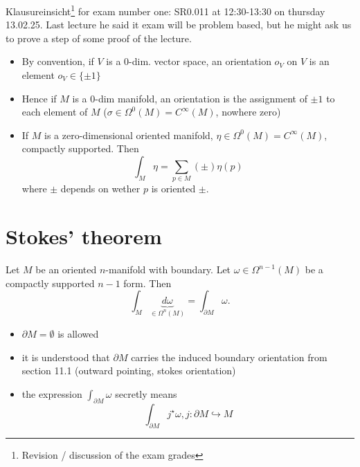
Klausureinsicht\footnote{Revision / discussion of the exam grades} for exam number one: SR0.011 at 12:30-13:30 on thursday 13.02.25.
Last lecture he said it exam will be problem based, but he might ask us to prove a step of some proof of the lecture.

\begin{remark}
    \begin{itemize}
        \item By convention, if \(V\) is a 0-dim. vector space, an orientation \(o_V\) on \(V\) is an element \(o_V\in \{\pm 1\}\)
        \item Hence if \(M\) is a 0-dim manifold, an orientation is the assignment of \(\pm 1\) to each element of \(M\) (\(\sigma\in \Omega^0(M)=C^\infty(M)\), nowhere zero)
        \item If \(M\) is a zero-dimensional oriented manifold, \(\eta\in \Omega^0(M)=C^\infty(M)\), compactly supported. Then \[\int_M \eta=\sum_{p\in M}(\pm)\eta(p)\] where \(\pm\) depends on wether \(p\) is oriented \(\pm\).  
    \end{itemize}
\end{remark}

\section{Stokes' theorem}

\begin{theorem}\label{thm:11.9}
    Let \(M\) be an oriented \(n\)-manifold with boundary. Let 
    \(\omega\in \Omega^{n-1}(M)\) be a compactly supported \(n-1\) form. Then 
    \[\int_M \underbrace{d\omega}_{\in \Omega^n(M)}=\int_{\partial M} \omega.\]
\end{theorem}

\begin{remark}
    \begin{itemize}
        \item \(\partial M =\emptyset\) is allowed 
        \item it is understood that \(\partial M\) carries the induced boundary orientation from section 11.1 (outward pointing, stokes orientation)
        \item the expression \(\int_{\partial M}\omega\) secretly means \[\int_{\partial M} j^\star \omega,j:\partial M \hookrightarrow M\]
    \end{itemize}
\end{remark}

